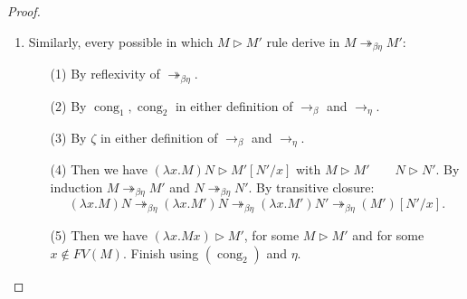 \begin{proof}
\begin{enumerate}
  \item Similarly, every possible in which $M\triangleright M'$ rule derive in  $M \twoheadrightarrow_{\beta\eta} M'$:
    \begin{itemize}
    \item[(1)] By reflexivity of $ \twoheadrightarrow_{\beta\eta}$.
    \item[(2)] By $\operatorname{cong}_1,\operatorname{cong}_2$ in either definition of $\to_\beta$ and $\to_\eta$.
    \item[(3)] By $\zeta$ in either definition of $\to_\beta$ and $\to_\eta$.
    \item[(4)] Then we have $(\lambda x.M)N \triangleright M'[N'/x]$ with $M \triangleright M'\qquad N \triangleright N'$. By induction $M \twoheadrightarrow_{\beta\eta} M'$ and $N \twoheadrightarrow_{\beta\eta} N'$. By transitive closure:
      $$(\lambda x.M)N \twoheadrightarrow_{\beta\eta}(\lambda x.M')N \twoheadrightarrow_{\beta\eta} (\lambda x.M')N' \twoheadrightarrow_{\beta\eta} (M')[N'/x].$$
    \item[(5)] Then we have $(\lambda x.Mx) \triangleright M'$, for some $M\triangleright M'$ and for some $x \not  \in FV(M)$. Finish using $(\operatorname{cong}_2)$ and $\eta$.
    \end{itemize}

  \end{enumerate}

\end{proof}

